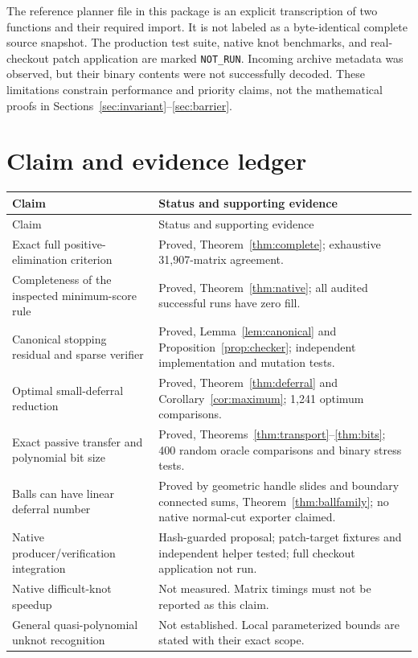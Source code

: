 \documentclass[11pt]{article}
\theoremstyle{definition}\newtheorem{definition}[theorem]{Definition}
\theoremstyle{remark}\newtheorem{remark}[theorem]{Remark}
\begin{document}
The reference planner file in this package is an explicit transcription of two functions and their required import. It is not labeled as a byte-identical complete source snapshot. The production test suite, native knot benchmarks, and real-checkout patch application are marked \texttt{NOT\_RUN}. Incoming archive metadata was observed, but their binary contents were not successfully decoded. These limitations constrain performance and priority claims, not the mathematical proofs in Sections~\ref{sec:invariant}--\ref{sec:barrier}.

\section{Claim and evidence ledger}
\begin{longtable}{@{}p{}p{}@{}}
\toprule
Claim & Status and supporting evidence\\
\midrule
\endfirsthead
\toprule Claim & Status and supporting evidence\\\midrule
\endhead
Exact full positive-elimination criterion & Proved, Theorem~\ref{thm:complete}; exhaustive 31,907-matrix agreement.\\[5pt]
Completeness of the inspected minimum-score rule & Proved, Theorem~\ref{thm:native}; all audited successful runs have zero fill.\\[5pt]
Canonical stopping residual and sparse verifier & Proved, Lemma~\ref{lem:canonical} and Proposition~\ref{prop:checker}; independent implementation and mutation tests.\\[5pt]
Optimal small-deferral reduction & Proved, Theorem~\ref{thm:deferral} and Corollary~\ref{cor:maximum}; 1,241 optimum comparisons.\\[5pt]
Exact passive transfer and polynomial bit size & Proved, Theorems~\ref{thm:transport}--\ref{thm:bits}; 400 random oracle comparisons and binary stress tests.\\[5pt]
Balls can have linear deferral number & Proved by geometric handle slides and boundary connected sums, Theorem~\ref{thm:ballfamily}; no native normal-cut exporter claimed.\\[5pt]
Native producer/verification integration & Hash-guarded proposal; patch-target fixtures and independent helper tested; full checkout application not run.\\[5pt]
Native difficult-knot speedup & Not measured. Matrix timings must not be reported as this claim.\\[5pt]
General quasi-polynomial unknot recognition & Not established. Local parameterized bounds are stated with their exact scope.\\
\bottomrule
\end{longtable}
\end{document}
